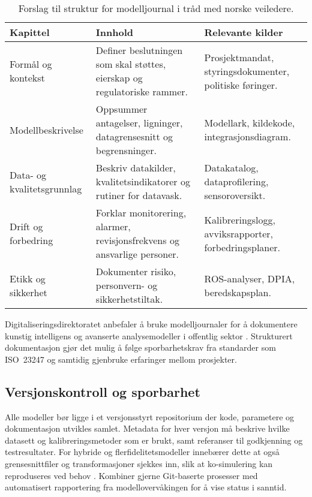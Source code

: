 \begin{table}[ht]
    \centering
    \caption{Forslag til struktur for modelljournal i tråd med norske veiledere.}
    \label{tab:kap02-modelljournal}
    \begin{tabular}{p{}p{}p{}}
        \toprule
        \textbf{Kapittel} & \textbf{Innhold} & \textbf{Relevante kilder} \\
        \midrule
        Formål og kontekst & Definer beslutningen som skal støttes, eierskap og regulatoriske rammer. & Prosjektmandat, styringsdokumenter, politiske føringer. \\
        Modellbeskrivelse & Oppsummer antagelser, ligninger, datagrensesnitt og begrensninger. & Modellark, kildekode, integrasjonsdiagram. \\
        Data- og kvalitetsgrunnlag & Beskriv datakilder, kvalitetsindikatorer og rutiner for datavask. & Datakatalog, dataprofilering, sensoroversikt. \\
        Drift og forbedring & Forklar monitorering, alarmer, revisjonsfrekvens og ansvarlige personer. & Kalibreringslogg, avviksrapporter, forbedringsplaner. \\
        Etikk og sikkerhet & Dokumenter risiko, personvern- og sikkerhetstiltak. & ROS-analyser, DPIA, beredskapsplan. \\
        \bottomrule
    \end{tabular}
\end{table}

Digitaliseringsdirektoratet anbefaler å bruke modelljournaler for å dokumentere kunstig intelligens og avanserte analysemodeller
i offentlig sektor \citep{digdir2023modelljournal}. Strukturert dokumentasjon gjør det mulig å følge sporbarhetskrav fra
standarder som ISO~23247 og samtidig gjenbruke erfaringer mellom prosjekter.

\subsection{Versjonskontroll og sporbarhet}
Alle modeller bør ligge i et versjonsstyrt repositorium der kode, parametere og dokumentasjon utvikles samlet. Metadata for hver versjon må beskrive hvilke datasett og kalibreringsmetoder som er brukt, samt referanser til godkjenning og testresultater. For hybride og flerfidelitetsmodeller innebærer dette at også grensesnittfiler og transformasjoner sjekkes inn, slik at ko-simulering kan reproduseres ved behov \citep{boschert2018digital}. Kombiner gjerne Git-baserte prosesser med automatisert rapportering fra modellovervåkingen for å vise status i sanntid.

